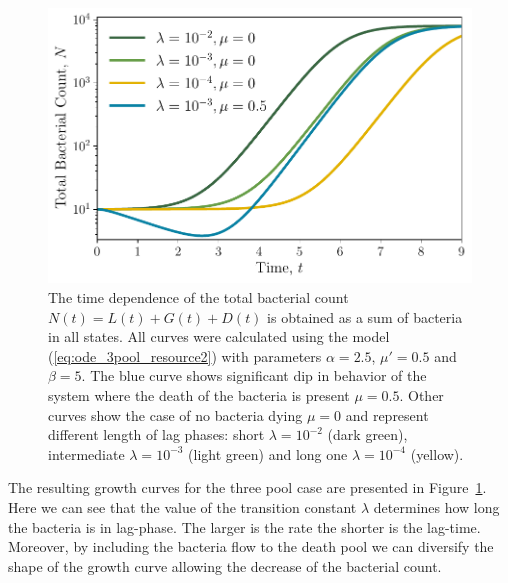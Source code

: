 \documentclass[10pt,A4paper]{article}
\numberwithin{equation}{section}
\begin{document}
\begin{figure}
    \begin{center}
    \includegraphics[width=0.9\columnwidth]{Figures/pool_model_3pools_resource.pdf}
    \caption{
        The time dependence of the total bacterial count $N(t) = L(t) + G(t) + D(t)$ is obtained as a sum of bacteria in all states.
        All curves were calculated using the model (\ref{eq:ode_3pool_resource2}) with parameters $\alpha=2.5$, $\mu'=0.5$ and $\beta=5$.
        The blue curve shows significant dip in behavior of the system where the death of the bacteria is present $\mu = 0.5$.
        Other curves show the case of no bacteria dying $\mu=0$ and represent different length of lag phases:
        short $\lambda=10^{-2}$ (dark green), intermediate $\lambda=10^{-3}$ (light green) and long one $\lambda=10^{-4}$ (yellow).
    }
    \label{fig:3pool_resource_plots}
    \end{center}
\end{figure}
The resulting growth curves for the three pool case are presented in Figure~\ref{fig:3pool_resource_plots}.
Here we can see that the value of the transition constant $\lambda$ determines how long the bacteria is in lag-phase.
The larger is the rate the shorter is the lag-time.
Moreover, by including the bacteria flow to the death pool we can diversify the shape of the growth curve allowing the decrease of the bacterial count.
%
%
%
\end{document}
